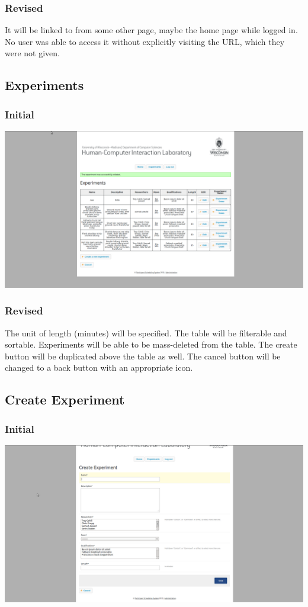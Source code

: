 \subsubsection{Revised}
It will be linked to from some other page, maybe the home page while logged in. No user was able to access it without explicitly visiting the URL, which they were not given.

\subsection{Experiments}
\subsubsection{Initial}
\includegraphics[width=6in]{../other/initial-interface-design/experiments.png}
\subsubsection{Revised}
The unit of length (minutes) will be specified. The table will be filterable and sortable. Experiments will be able to be mass-deleted from the table. The create button will be duplicated above the table as well. The cancel button will be changed to a back button with an appropriate icon.

\subsection{Create Experiment}
\subsubsection{Initial}
\includegraphics[width=6in]{../other/initial-interface-design/create-experiment.png}
